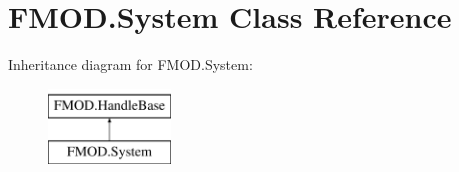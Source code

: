 \hypertarget{class_f_m_o_d_1_1_system}{}\section{F\+M\+O\+D.\+System Class Reference}
\label{class_f_m_o_d_1_1_system}
Inheritance diagram for F\+M\+O\+D.\+System\+:\begin{figure}[H]
\begin{center}
\leavevmode
\includegraphics[height=2.000000cm]{class_f_m_o_d_1_1_system}
\end{center}
\end{figure}
